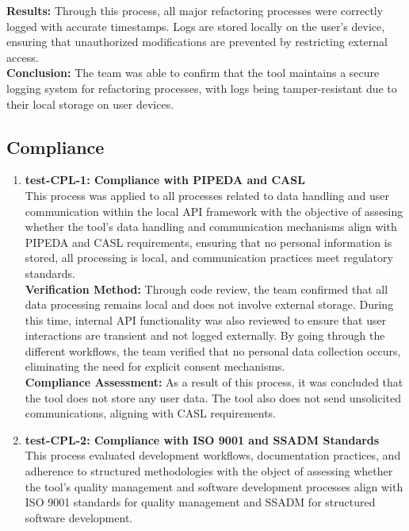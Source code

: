 \documentclass[12pt, titlepage]{article}
\begin{document}
\noindent \textbf{Results:} Through this process, all major refactoring processes were
correctly logged with accurate timestamps. Logs are stored locally on
the user's device, ensuring that unauthorized modifications are
prevented by restricting external access.\\

\noindent \textbf{Conclusion:} The team was able to confirm that the tool maintains a
secure logging system for refactoring processes, with logs being
tamper-resistant due to their local storage on user devices.

\subsection{Compliance}
\begin{enumerate}

  \item \textbf{test-CPL-1: Compliance with PIPEDA and CASL} \\[2mm]
    This process was applied to all processes related to data
    handling and user communication within the local API framework
    with the objective of assesing whether the tool's data handling
    and communication mechanisms align with PIPEDA and CASL
    requirements, ensuring that no personal information is stored,
    all processing is local, and communication practices meet
    regulatory standards.\\
    
    \noindent \textbf{Verification Method:} Through code review, the team confirmed that all data
    processing remains local and does not involve external storage.
    During this time, internal API functionality was also reviewed to
    ensure that user interactions are transient and not logged
    externally. By going through the different workflows, the team
    verified that no personal data collection occurs, eliminating the
    need for explicit consent mechanisms.\\
    
    \noindent \textbf{Compliance Assessment:} As a result of this process, it was concluded that the
    tool does not store any user data. The tool also does not send
    unsolicited communications, aligning with CASL requirements.

  \item \textbf{test-CPL-2: Compliance with ISO 9001 and SSADM
    Standards} \\[2mm]
    This process evaluated development workflows, documentation
    practices, and adherence to structured methodologies with the
    object of assessing whether the tool's quality management and
    software development processes align with ISO 9001 standards for
    quality management and SSADM for structured software development.\\
    

\end{enumerate}
\end{document}
